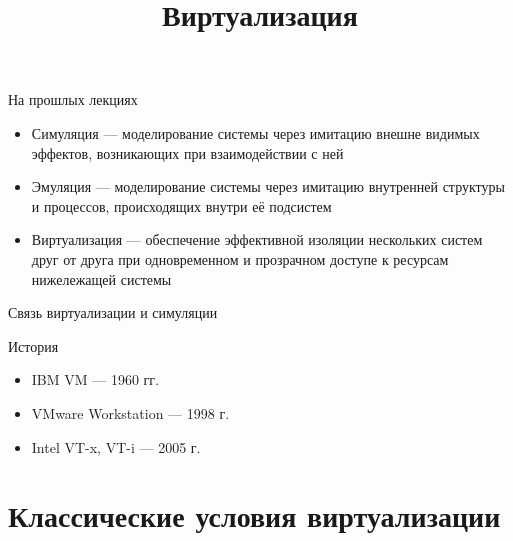 
\title{Виртуализация}



\begin{frame}
\titlepage
\end{frame}

\begin{frame}
\tableofcontents
\end{frame}

\begin{frame}{На прошлых лекциях}
\begin{itemize}
\item Симуляция —  моделирование системы через имитацию внешне видимых эффектов, возникающих при взаимодействии с ней
\item Эмуляция — моделирование системы через имитацию внутренней структуры и процессов, происходящих внутри её подсистем
\item Виртуализация — обеспечение эффективной изоляции нескольких систем друг от друга при одновременном и прозрачном доступе к ресурсам нижележащей системы
\end{itemize}

\end{frame}

\begin{frame}{Связь виртуализации и симуляции}

\centering
{}

\vfill


\end{frame}

\begin{frame}{История}
\begin{itemize}
\item IBM VM — 1960 гг. \cite{goldberg}
\item VMware Workstation — 1998 г.
\item Intel VT-x, VT-i — 2005 г.
\end{itemize}


\end{frame}

\section{Классические условия виртуализации}

